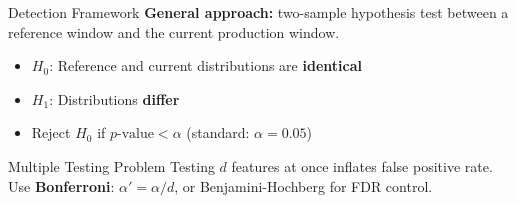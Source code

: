 \documentclass[10pt,aspectratio=169]{beamer}
\begin{document}
\begin{frame}{Detection Framework}
  \textbf{General approach:} two-sample hypothesis test between a reference window and the current production window.
  \vspace{0.2cm}
  \begin{center}
  \end{center}
  \vspace{0.2cm}
  \begin{itemize}
    \item $H_0$: Reference and current distributions are \textbf{identical}
    \item $H_1$: Distributions \textbf{differ}
    \item Reject $H_0$ if $p\text{-value} < \alpha$ \quad (standard: $\alpha = 0.05$)
  \end{itemize}
  \vspace{0.1cm}
  \begin{alertblock}{Multiple Testing Problem}
    Testing $d$ features at once inflates false positive rate. Use \textbf{Bonferroni}: $\alpha' = \alpha/d$, or Benjamini-Hochberg for FDR control.
  \end{alertblock}
\end{frame}
\end{document}

